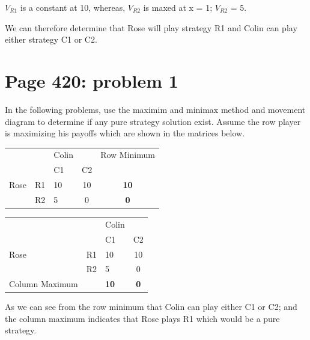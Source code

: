 \documentclass[]{article}
\begin{document}
\(V_{R1}\) is a constant at 10, whereas, \(V_{R2}\) is maxed at x = 1;
\(V_{R2}\) = 5.

We can therefore determine that Rose will play strategy R1 and Colin can
play either strategy C1 or C2.

\section{Page 420: problem 1}\label{page-420-problem-1}

In the following problems, use the maximim and minimax method and
movement diagram to determine if any pure strategy solution exist.
Assume the row player is maximizing his payoffs which are shown in the
matrices below.

\begin{table}[h]
    \begin{tabular}{lllcc}
    ~    & ~  & Colin & ~  & Row Minimum  \\
    ~    & ~  & C1    & C2 & ~            \\
    Rose & R1 & 10    & 10 & \textbf{10}   \\
    ~    & R2 & 5     & 0  & \textbf{0}   \\ \hline
    \end{tabular}
\end{table}

\begin{table}[h]
    \begin{tabular}{lllc}
    ~    & ~  & Colin & ~   \\
    ~    & ~  & C1    & C2  \\
    Rose & R1 & 10    & 10  \\
    ~    & R2 & 5     & 0     \\ 
    Column Maximum  & & \textbf{10} & \textbf{0}
    \\ \hline
    \end{tabular}
\end{table}

As we can see from the row minimum that Colin can play either C1 or C2;
and the column maximum indicates that Rose plays R1 which would be a
pure strategy.
\end{document}
